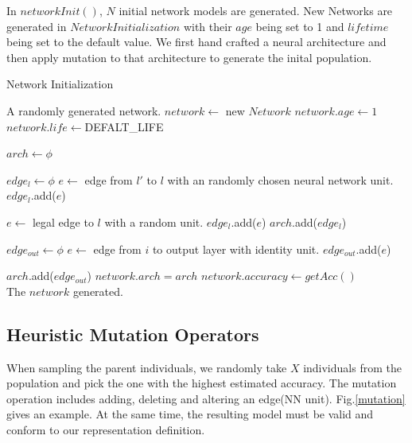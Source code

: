 \documentclass[conference]{IEEEtran}
\begin{document}
In $networkInit()$, $N$ initial network models are generated. New Networks are generated in $Network Initialization$ with their $age $ being set to 1 and $lifetime$ being set to the default value. We first hand crafted a neural architecture and then apply mutation to that architecture to generate the inital population. 

 \begin{algorithm}[H]  
    \caption{ Network Initialization}
    
    
    \begin{algorithmic}[1]  
        \Ensure A randomly generated network.
    \State $network\gets $ new $Network$
    \State $network.age\gets1$
    \State $network.life\gets $DEFALT\_LIFE 
    
    \State $arch\gets \phi$

    \State $edge_l \gets \phi$
    \State $e \gets$ edge from $l'$ to $l$ with an randomly chosen neural network unit.
    \State $edge_l$.add($e$)
    \EndIf
        \EndFor

        \State  $e \gets$ legal edge to $l$ with a random unit.
        \State $edge_l$.add($e$)
        \EndIf
    \State $arch$.add($edge_l$)
        \EndFor
    
    \State $edge_{out} \gets \phi$
      \State $e \gets$ edge from $i$ to output layer with identity unit.
      \State $edge_{out}$.add($e$)
    \EndFor

    \State $arch$.add($edge_{out}$)
    \State $network.arch=arch$
    \State $network.accuracy\gets getAcc()$
    \\
        \Return The $network$ generated.
        
    \end{algorithmic}  
\end{algorithm}  

  \subsection{Heuristic Mutation Operators}
  When sampling the parent individuals, we randomly take $X$ individuals from the population and pick the one with the highest estimated accuracy. The mutation operation includes adding, deleting and altering an edge(NN unit). Fig.\ref{mutation} gives an example. At the same time, the resulting model must be valid and conform to our representation definition. 
  
\end{document}

